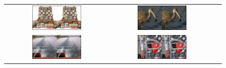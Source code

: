\documentclass{article}
\begin{document}
\begin{figure}
\begin{tabular}{@{}ccc@{}}
     \includegraphics[width=0.5\textwidth]{figures/upsampled/upsample_19.png} & \includegraphics[width=0.5\textwidth]{figures/upsampled/upsample_23.png} \\ \includegraphics[width=0.5\textwidth]{figures/upsampled/upsample_38.png} & \includegraphics[width=0.5\textwidth]{figures/upsampled/upsample_39.png} \\

\end{tabular}
\end{figure}
\end{document}
